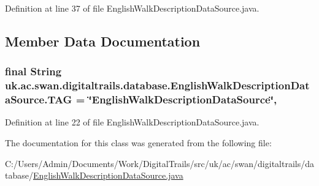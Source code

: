 Definition at line 37 of file English\+Walk\+Description\+Data\+Source.\+java.



\subsection{Member Data Documentation}
\hypertarget{classuk_1_1ac_1_1swan_1_1digitaltrails_1_1database_1_1_english_walk_description_data_source_a710b541c97a7aa4696ea4a8fc4055c3a}{
\subsubsection[{T\+A\+G}]{\setlength{\rightskip}{0pt plus 5cm}final String uk.\+ac.\+swan.\+digitaltrails.\+database.\+English\+Walk\+Description\+Data\+Source.\+T\+A\+G = \char`\"{}English\+Walk\+Description\+Data\+Source\char`\"{}\hspace{0.3cm}{\ttfamily [static]}, {\ttfamily [private]}}}\label{classuk_1_1ac_1_1swan_1_1digitaltrails_1_1database_1_1_english_walk_description_data_source_a710b541c97a7aa4696ea4a8fc4055c3a}


Definition at line 22 of file English\+Walk\+Description\+Data\+Source.\+java.



The documentation for this class was generated from the following file\+:\begin{DoxyCompactItemize}
\item 
C\+:/\+Users/\+Admin/\+Documents/\+Work/\+Digital\+Trails/src/uk/ac/swan/digitaltrails/database/\hyperlink{_english_walk_description_data_source_8java}{English\+Walk\+Description\+Data\+Source.\+java}\end{DoxyCompactItemize}
